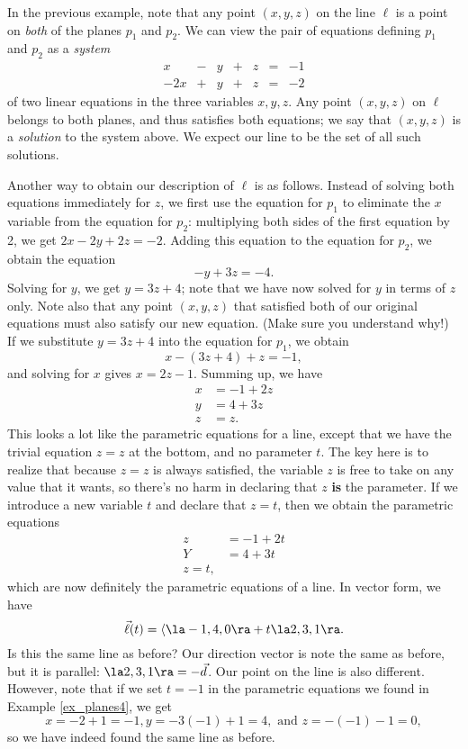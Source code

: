 In the previous example, note that any point $(x,y,z)$ on the line $\ell$ is a point on \textit{both} of the planes $p_1$ and $p_2$. We can view the pair of equations defining $p_1$ and $p_2$ as a \textit{system} 
\[
\begin{array}{ccccccc}
x&-&y&+&z&=&-1\\
-2x&+&y&+&z&=&-2
\end{array}
\]
of two linear equations in the three variables $x,y,z$. Any point $(x,y,z)$ on $\ell$ belongs to both planes, and thus satisfies both equations; we say that $(x,y,z)$ is a \textit{solution} to the system above. We expect our line to be the set of all such solutions. 

Another way to obtain our description of $\ell$ is as follows. Instead of solving both equations immediately for $z$, we first use the equation for $p_1$ to eliminate the $x$ variable from the equation for $p_2$: multiplying both sides of the first equation by 2, we get $2x-2y+2z=-2$. Adding this equation to the equation for $p_2$, we obtain the equation
\[
-y+3z=-4.
\]
Solving for $y$, we get $y=3z+4$; note that we have now solved for $y$ in terms of $z$ only. Note also that any point $(x,y,z)$ that satisfied both of our original equations must also satisfy our new equation. (Make sure you understand why!) If we substitute $y=3z+4$ into the equation for $p_1$, we obtain
\[
x-(3z+4)+z = -1,
\]
and solving for $x$ gives $x=2z-1$. Summing up, we have
\begin{align*}
x & = -1+2z\\
y & = 4+3z\\
z & = z.
\end{align*}
This looks a lot like the parametric equations for a line, except that we have the trivial equation $z=z$ at the bottom, and no parameter $t$. The key here is to realize that because $z=z$ is always satisfied, the variable $z$ is free to take on any value that it wants, so there's no harm in declaring that $z$ \textbf{is} the parameter. If we introduce a new variable $t$ and declare that $z=t$, then we obtain the parametric equations
\begin{align*}
z & = -1+2t\\
Y & = 4+3t\\
z = t,
\end{align*}
which are now definitely the parametric equations of a line. In vector form, we have
\[
\vec\ell(t) = \langle \la -1, 4, 0\ra + t\la 2, 3, 1\ra.
\]
Is this the same line as before? Our direction vector is note the same as before, but it is parallel: $\la 2,3,1\ra = -\vec{d}$. Our point on the line is also different. However, note that if we set $t=-1$ in the parametric equations we found in Example \ref{ex_planes4}, we get
\[
x = -2+1 = -1, y = -3(-1)+1 = 4, \text{ and } z = -(-1)-1 = 0,
\]
so we have indeed found the same line as before.\\

